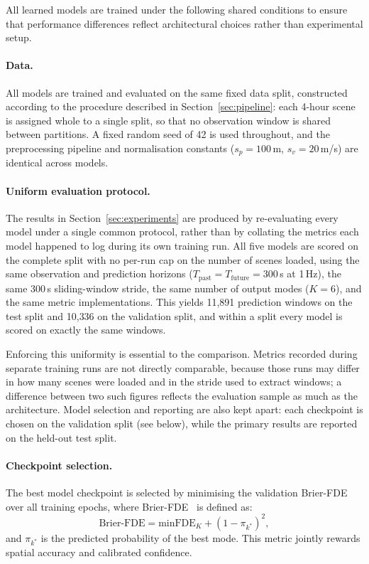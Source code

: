 \documentclass[12pt, a4paper]{article}
\begin{document}
All learned models are trained under the following shared conditions to
ensure that performance differences reflect architectural choices rather
than experimental setup.

\paragraph{Data.}
All models are trained and evaluated on the same fixed data split, constructed
according to the procedure described in Section~\ref{sec:pipeline}: each 4-hour
scene is assigned whole to a single split, so that no observation window is
shared between partitions.
A fixed random seed of 42 is used throughout, and the preprocessing pipeline and
normalisation constants ($s_p = 100$\,m, $s_v = 20$\,m/s) are identical across
models.

\paragraph{Uniform evaluation protocol.}
The results in Section~\ref{sec:experiments} are produced by re-evaluating every
model under a single common protocol, rather than by collating the metrics each
model happened to log during its own training run.  All five models are scored
on the complete split with no per-run cap on the number of scenes loaded, using
the same observation and prediction horizons
($T_{\text{past}} = T_{\text{future}} = 300$\,s at 1\,Hz), the same 300\,s
sliding-window stride, the same number of output modes ($K = 6$), and the same
metric implementations.  This yields 11{,}891 prediction windows on the test
split and 10{,}336 on the validation split, and within a split every model is
scored on exactly the same windows.

Enforcing this uniformity is essential to the comparison.  Metrics recorded
during separate training runs are not directly comparable, because those runs
may differ in how many scenes were loaded and in the stride used to extract
windows; a difference between two such figures reflects the evaluation sample as
much as the architecture.  Model selection and reporting are also kept apart:
each checkpoint is chosen on the validation split (see below), while the primary
results are reported on the held-out test split.

\paragraph{Checkpoint selection.}
The best model checkpoint is selected by minimising the validation
Brier-FDE over all training epochs, where
Brier-FDE~\citep{feng2024unitraj} is defined as:
\begin{equation}
  \text{Brier-FDE} = \text{minFDE}_K + (1 - \pi_{k^*})^2,
  \label{eq:brier_fde}
\end{equation}
and $\pi_{k^*}$ is the predicted probability of the best mode.
This metric jointly rewards spatial accuracy and calibrated confidence.
\end{document}
